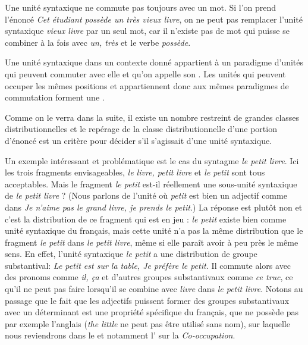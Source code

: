 Une unité syntaxique ne commute pas toujours avec un mot. Si l’on prend l’énoncé \textit{Cet étudiant possède un très vieux livre}, on ne peut pas remplacer l’unité syntaxique \textit{vieux livre} par un seul mot, car il n’existe pas de mot qui puisse se combiner à la fois avec \textit{un, très} et le verbe \textit{possède}.

{Une unité syntaxique dans un contexte donné appartient à un paradigme d’unités qui peuvent commuter avec elle et qu’on appelle son . Les unités qui peuvent occuper les mêmes positions et appartiennent donc aux mêmes paradigmes de commutation forment une .}

Comme on le verra dans la suite, il existe un nombre restreint de grandes classes distributionnelles et le repérage de la classe distributionnelle d’une portion d’énoncé est un critère pour décider s’il s’agissait d’une unité syntaxique.

Un exemple intéressant et problématique est le cas du syntagme \textit{le petit livre}. Ici les trois fragments envisageables, \textit{le livre, petit livre} et \textit{le petit} sont tous acceptables. Mais le fragment \textit{le petit} est-il réellement une sous-unité syntaxique de \textit{le petit livre} ? (Nous parlons de l’unité où \textit{petit} est bien un adjectif comme dans \textit{Je n’aime pas le grand livre, je prends le petit}.) La réponse est plutôt non et c’est la distribution de ce fragment qui est en jeu : \textit{le petit} existe bien comme unité syntaxique du français, mais cette unité n’a pas la même distribution que le fragment \textit{le petit} dans \textit{le petit livre}, même si elle paraît avoir à peu près le même sens. En effet, l’unité syntaxique \textit{le petit} a une distribution de groupe substantival: \textit{Le petit est sur la table, Je préfère le petit.} Il commute alors avec des pronoms comme \textit{il, ça} et d’autres groupes substantivaux comme \textit{ce truc}, ce qu’il ne peut pas faire lorsqu’il se combine avec \textit{livre} dans \textit{le petit livre}. Notons au passage que le fait que les adjectifs puissent former des groupes substantivaux avec un déterminant est une propriété spécifique du français, que ne possède pas par exemple l’anglais (\textit{the little} ne peut pas être utilisé sans nom), sur laquelle nous reviendrons dans le  et notamment l’ sur la \textit{Co-occupation}.

